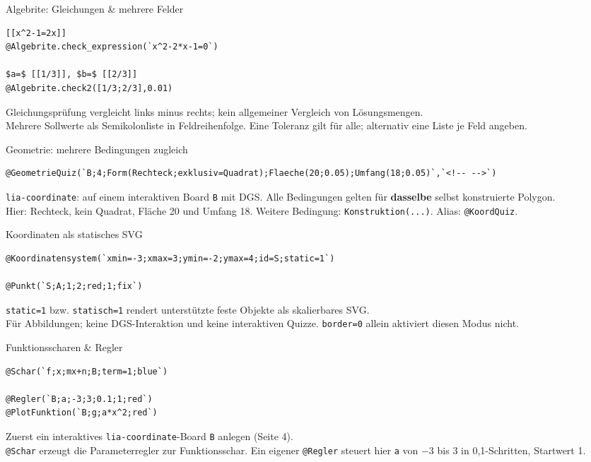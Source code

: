 \documentclass[a4paper,landscape,9pt]{extarticle}
\newcommand{\prevsm}[1]{{\footnotesize\color{muted} #1}}
\begin{document}
\begin{multicols}{3}
\begin{extracard}{Algebrite: Gleichungen \& mehrere Felder}
\begin{lstlisting}[language=lia]
[[x^2-1=2x]]
@Algebrite.check_expression(`x^2-2*x-1=0`)

$a=$ [[1/3]], $b=$ [[2/3]]
@Algebrite.check2([1/3;2/3],0.01)
\end{lstlisting}
\tcblower
\prevsm{Gleichungsprüfung vergleicht links minus rechts; kein allgemeiner Vergleich von Lösungsmengen.\\[2pt]
Mehrere Sollwerte als Semikolonliste in Feldreihenfolge. Eine Toleranz gilt für alle; alternativ eine Liste je Feld angeben.}
\end{extracard}

\columnbreak

\begin{extracard}{Geometrie: mehrere Bedingungen zugleich}
\begin{lstlisting}[language=lia]
@GeometrieQuiz(`B;4;Form(Rechteck;exklusiv=Quadrat);Flaeche(20;0.05);Umfang(18;0.05)`,`<!-- -->`)
\end{lstlisting}
\tcblower
\prevsm{\texttt{lia-coordinate}: auf einem interaktiven Board \texttt{B} mit DGS. Alle Bedingungen gelten für \textbf{dasselbe} selbst konstruierte Polygon.\\[2pt]
Hier: Rechteck, kein Quadrat, Fläche 20 und Umfang 18. Weitere Bedingung: \texttt{Konstruktion(...)}. Alias: \texttt{@KoordQuiz}.}
\end{extracard}

\begin{extracard}{Koordinaten als statisches SVG}
\begin{lstlisting}[language=lia]
@Koordinatensystem(`xmin=-3;xmax=3;ymin=-2;ymax=4;id=S;static=1`)

@Punkt(`S;A;1;2;red;1;fix`)
\end{lstlisting}
\tcblower
\prevsm{\texttt{static=1} bzw. \texttt{statisch=1} rendert unterstützte feste Objekte als skalierbares SVG.\\[2pt]
Für Abbildungen; keine DGS-Interaktion und keine interaktiven Quizze. \texttt{border=0} allein aktiviert diesen Modus nicht.}
\end{extracard}

\begin{extracard}{Funktionsscharen \& Regler}
\begin{lstlisting}[language=lia]
@Schar(`f;x;mx+n;B;term=1;blue`)

@Regler(`B;a;-3;3;0.1;1;red`)
@PlotFunktion(`B;g;a*x^2;red`)
\end{lstlisting}
\tcblower
\prevsm{Zuerst ein interaktives \texttt{lia-coordinate}-Board \texttt{B} anlegen (Seite 4).\\[2pt]
\texttt{@Schar} erzeugt die Parameterregler zur Funktionsschar. Ein eigener \texttt{@Regler} steuert hier \texttt{a} von $-3$ bis $3$ in 0,1-Schritten, Startwert 1.}
\end{extracard}


\end{multicols}
\end{document}
